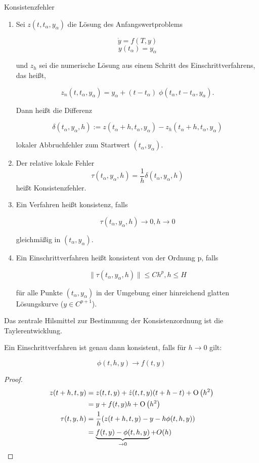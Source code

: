 \begin{definition}[Definition IV.4] Konsistenzfehler
	\begin{enumerate}
		\item
			Sei $z(t, t_\alpha, y_\alpha)$ die Lösung des Anfangswertproblems 
		
			$$\dot{y} = f(T,y)$$
			$$y(t_\alpha) = y_\alpha$$
		
			und $z_h$ sei die numerische Lösung aus einem Schritt des Einschrittverfahrens, das heißt, 
			
			$$z_n(t, t_\alpha, y_\alpha) = y_\alpha + (t - t_\alpha) \; \phi(t_\alpha, t-t_\alpha, y_\alpha).$$
			
			Dann heißt die Differenz 
			
			$$\delta(t_\alpha, y_\alpha, h) := z(t_\alpha + h, t_\alpha, y_\alpha) - z_h(t_\alpha + h, t_\alpha, y_\alpha)$$
			
			lokaler Abbruchfehler zum Startwert $(t_\alpha, y_\alpha)$.
		\item
			Der relative lokale Fehler
			$$\tau(t_\alpha, y_\alpha, h) = \frac{1}{h}\delta(t_\alpha, y_\alpha, h)$$
			heißt Konsistenzfehler.
			
		\item
			Ein Verfahren heißt konsistenz, falls 
			
			$$\tau(t_\alpha, y_\alpha, h) \to 0, h \to 0$$
			
			gleichmäßig in $(t_\alpha, y_\alpha)$.
			
		\item
			Ein Einschrittverfahren heißt konsistent von der Ordnung p, falls 
			
			$$\|\tau(t_\alpha, y_\alpha, h)\| \le C h^p, h \le H$$ 
			
			für alle Punkte $(t_\alpha, y_\alpha)$ in der Umgebung einer hinreichend glatten Lösungskurve ($y \in C^{p+1}$).
	\end{enumerate}
\end{definition}

Das zentrale Hilsmittel zur Bestimmung der Konsistenzordnung ist die Taylerentwicklung.

\begin{lemma}
	Ein Einschrittverfahren ist genau dann konsistent, falls für $h \to 0$ gilt:
	
	$$\phi(t,h,y) \to f(t,y)$$
\end{lemma}	

\begin{proof}
	\begin{align*}
		z(t+h, t, y) &= z(t,t,y) + \dot{z}(t,t,y)(t+h-t) + \operatorname{O}\left(h^2\right) \\
		&= y + f(t,y) h + \operatorname{O}\left(h^2\right) \\
		\tau(t,y,h) &= \frac{1}{h} (z(t+h, t, y) - y - h \phi (t,h,y)) \\
		 &= \underbrace{f(t,y) - \phi(t,h,y)}_{\to 0} + O(h) 
	\end{align*}
\end{proof}

